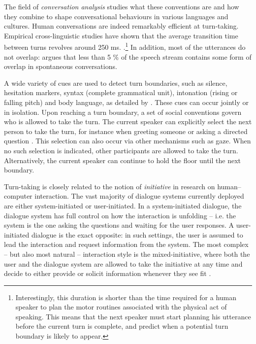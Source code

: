 The field of  \textit{conversation analysis} studies what these conventions are and how they combine to shape conversational behaviours in various languages and cultures. Human conversations are indeed remarkably efficient at turn-taking.  Empirical cross-linguistic studies have shown that the average transition time between turns revolves around 250 ms. \citep{Stivers30062009}.\footnote{Interestingly, this duration is shorter than the time required for a human speaker to plan the motor routines associated with the physical act of speaking.  This means that the next speaker must start planning his utterance before the current turn is complete, and predict when a potential turn boundary is likely to appear.} In addition, most of the utterances do not overlap: \cite{Levinson1983} argues that less than 5 \% of the speech stream contains some form of overlap in spontaneous conversations.  

A wide variety of cues are used to detect turn boundaries, such as silence, hesitation markers, syntax (complete grammatical unit), intonation (rising or falling pitch) and body language, as detailed by \cite{Duncan1972}.   These cues can occur jointly or in isolation. Upon reaching a turn boundary, a set of social conventions govern who is allowed to take the turn.  The current speaker can explicitly select the next person to take the turn, for instance when greeting someone or asking a directed question \citep{sacks1974}.   This selection can also occur via other mechanisms such as gaze.  When no such selection is indicated, other participants are allowed to take the turn.  Alternatively, the current speaker can continue to hold the floor until the next boundary. 

Turn-taking is closely related to the notion of \textit{initiative} in research on human--computer interaction. The vast majority of dialogue systems currently deployed are either system-initiated or user-initiated.  In a system-initiated dialogue, the dialogue system has full control on how the interaction is unfolding -- i.e. the system is the one asking the questions and waiting for the user responses.  A user-initiated dialogue is the exact opposite: in such settings, the user is assumed to lead the interaction and request information from the system.  The most complex -- but also most natural -- interaction style is the mixed-initiative, where both the user and the dialogue system are allowed to take the initiative at any time and decide to either provide or solicit information whenever they see fit \citep{Horvitz:1999}. 

